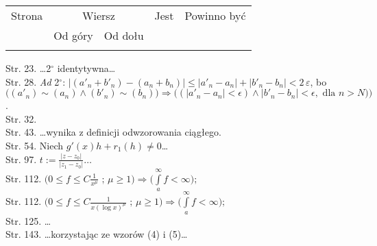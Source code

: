 \documentclass[a4paper,11pt]{article}
\begin{document}
\newpage



\begin{center}

  \begin{tabular}{|c|c|c|c|c|}
    \hline
    Strona & \multicolumn{2}{c|}{Wiersz} & Jest
                              & Powinno być \\ \cline{2-3}
    & Od góry & Od dołu & & \\
    \hline
    & & & & \\
    \hline
  \end{tabular}

\end{center}


\noindent
Str. 23. \ldots 2$^{ \circ }$ identytywna\ldots \\
Str. 28. \textit{Ad} 2$^{ \circ }$: $| ( a'_{ n } + b'_{ n } )
- ( a_{ n } + b_{ n } ) |  \leq | a'_{ n } - a_{ n } | + | b'_{ n } - b_{ n } |
< 2 \, \varepsilon$, bo \\
$\big( ( a'_{ n } ) \sim ( a_{ n } ) \wedge( b'_{ n } ) \sim ( b_{ n } ) \big)
\Rightarrow \big( ( | a'_{ n } - a_{ n } | < \epsilon )
\wedge | b'_{ n } - b_{ n } | < \epsilon, \textrm{ dla } n > N ) \big)$. \\
Str. 32. \\
Str. 43. \ldots wynika z definicji odwzorowania ciągłego. \\
Str. 54. Niech $g'( x ) h + r_{ 1 }( h ) \neq 0$\ldots \\
Str. 97. $t := \frac{ | z - z_{ 0 } | }{ | z_{ 1 } - z_{ 0 } | }
\textrm{\ldots}$ \\
Str. 112.
$\big( 0 \leq f \leq C \frac{ 1 }{ x^{ \mu } } \textrm{ ; } \mu \geq 1 \big)
\Rightarrow \big( \int \limits^{ \infty }_{ a } f < \infty \big) \textrm{;}$ \\
Str. 112.
$\big( 0 \leq f \leq C \frac{ 1 }{ x ( \log x )^{ \mu } } \textrm{ ; } \mu \geq 1 \big)
\Rightarrow \big( \int \limits^{ \infty }_{ a } f < \infty \big) \textrm{;}$ \\
Str. 125. \ldots \\
Str. 143. \ldots korzystając ze wzorów (4) i (5)\ldots


\vspace{\spaceTwo}
\end{document}
